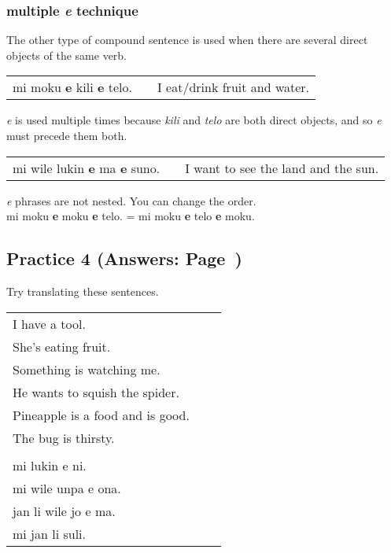 \subsubsection*{multiple \textit{e} technique}
%
The other type of compound sentence is used when there are several direct objects of the same verb.

\begin{supertabular}{p{5,5cm}|ll}
mi moku \textbf{e} kili \textbf{e} telo. && I eat/drink fruit and water. \\
\end{supertabular} 

\textit{e} is used multiple times because \textit{kili} and \textit{telo} are both direct objects, and so \textit{e} must precede them both. 

\begin{supertabular}{p{5,5cm}|ll}
mi wile lukin \textbf{e} ma \textbf{e} suno. && I want to see the land and the sun. \\
\end{supertabular} 
\textit{e} phrases are not nested. You can change the order. \\
mi moku \textbf{e} moku \textbf{e} telo. = mi moku \textbf{e} telo \textbf{e} moku. 
%
\subsection*{Practice 4 (Answers: Page~\pageref{'direct_objects_compund_sentences'})}
%
Try translating these sentences.  

\begin{supertabular}{p{5,5cm}|ll}
I have a tool. &&  \\ %
She's eating fruit. &&  \\ %
Something is watching me. &&  \\ %
He wants to squish the spider. &&  \\ %
Pineapple is a food and is good. &&  \\ %
The bug is thirsty. && \\ %
  && \\ %
mi lukin e ni. &&  \\ %
mi wile unpa e ona. &&   \\ %
jan li wile jo e ma. &&  \\ %
mi jan li suli. &&  \\ %
\end{supertabular} 

